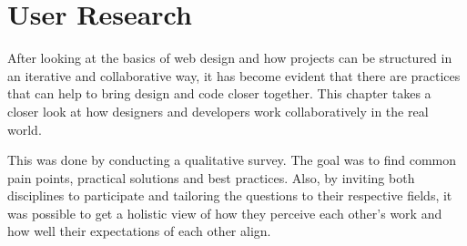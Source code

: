 \newpage
\section{User Research}
After looking at the basics of web design and how projects can be structured in an iterative and
collaborative way, it has become evident that there are practices that can help to bring design and
code closer together. This chapter takes a closer look at how designers and developers work
collaboratively in the real world. 

This was done by conducting a qualitative survey. The goal was to find common pain points, practical
solutions and best practices. Also, by inviting both disciplines to participate and tailoring the
questions to their respective fields, it was possible to get a holistic view of how they perceive
each other's work and how well their expectations of each other align. 


